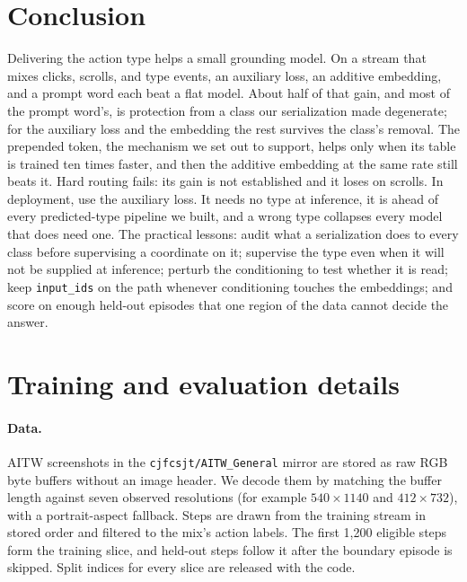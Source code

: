 \documentclass[letterpaper]{article} %
\begin{document}
\section{Conclusion}
\label{sec:conclusion}
Delivering the action type helps a small grounding model. On a stream that mixes clicks, scrolls, and type events, an auxiliary loss, an additive embedding, and a prompt word each beat a flat model. About half of that gain, and most of the prompt word's, is protection from a class our serialization made degenerate; for the auxiliary loss and the embedding the rest survives the class's removal. The prepended token, the mechanism we set out to support, helps only when its table is trained ten times faster, and then the additive embedding at the same rate still beats it. Hard routing fails: its gain is not established and it loses on scrolls.
In deployment, use the auxiliary loss. It needs no type at inference, it is ahead of every predicted-type pipeline we built, and a wrong type collapses every model that does need one. The practical lessons: audit what a serialization does to every class before supervising a coordinate on it; supervise the type even when it will not be supplied at inference; perturb the conditioning to test whether it is read; keep \texttt{input\_ids} on the path whenever conditioning touches the embeddings; and score on enough held-out episodes that one region of the data cannot decide the answer.



\appendix

\section{Training and evaluation details}
\label{app:details}
\paragraph{Data.} AITW screenshots in the \texttt{cjfcsjt/AITW\_General} mirror are stored as raw RGB byte buffers without an image header. We decode them by matching the buffer length against seven observed resolutions (for example $540\times1140$ and $412\times732$), with a portrait-aspect fallback. Steps are drawn from the training stream in stored order and filtered to the mix's action labels. The first 1,200 eligible steps form the training slice, and held-out steps follow it after the boundary episode is skipped. Split indices for every slice are released with the code.
\end{document}
